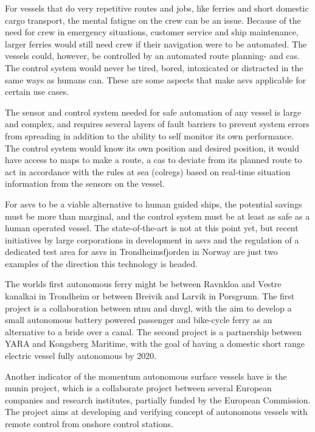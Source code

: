 For vessels that do very repetitive routes and jobs, like ferries and short domestic cargo transport, the mental fatigue on the crew can be an issue. Because of the need for crew in emergency situations, customer service and ship maintenance, larger ferries would still need crew if their navigation were to be automated. The vessels could, however, be controlled by an automated route planning- and \gls{cas}. The control system would never be tired, bored, intoxicated or distracted in the same ways as humans can. These are some aspects that make \glspl{asv} applicable for certain use cases.

The sensor and control system needed for safe automation of any vessel is large and complex, and requires several layers of fault barriers to prevent system errors from spreading in addition to the ability to self monitor its own performance. The control system would know its own position and desired position, it would have access to maps to make a route, a \gls{cas} to deviate from its planned route to act in accordance with the rules at sea (\gls{colregs}) based on real-time situation information from the sensors on the vessel.

For \glspl{asv} to be a viable alternative to human guided ships, the potential savings must be more than marginal, and the control system must be at least as safe as a human operated vessel. The state-of-the-art is not at this point yet, but recent initiatives by large corporations in development in \glspl{asv} and the regulation of a dedicated test area for \glspl{asv} in Trondheimsfjorden in Norway are just two examples of the direction this technology is headed.

The worlds first autonomous ferry might be between Ravnkloa and Vestre kanalkai in Trondheim or between Breivik and Larvik in Porsgrunn. The first project is a collaboration between \gls{ntnu} and \gls{dnvgl}, with the aim to develop a small autonomous battery powered passenger and bike-cycle ferry as an alternative to a bride over a canal. The second project is a partnership between YARA and Kongsberg Maritime, with the goal of having a domestic short range electric vessel fully autonomous by 2020.

Another indicator of the momentum autonomous surface vessels have is the \gls{munin} project, which is a collaborate project between several European companies and research institutes, partially funded by the European Commission. The project aims at developing and verifying concept of autonomous vessels with remote control from onshore control stations.

